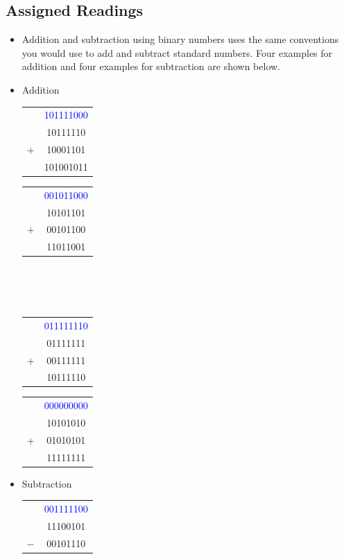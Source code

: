 \documentclass[10pt,a4paper]{article}
\begin{document}
\subsection{Assigned Readings}
\begin{itemize}
\item Addition and subtraction using binary numbers uses the same conventions you would use to add and subtract standard numbers. Four examples for addition and four examples for subtraction are shown below. 
\item Addition\\
\begin{tabular}{cc}
  & \textcolor{blue}{101111000}\\
  & 10111110\\
+ & 10001101\\
\hline
 & 101001011\\
\end{tabular}\hspace{.5cm}
\begin{tabular}{cc}
  & \textcolor{blue}{001011000}\\
  & 10101101\\
+ & 00101100\\
\hline
 & 11011001\\
\end{tabular}\\~\\~\\
\begin{tabular}{cc}
  & \textcolor{blue}{011111110}\\
  & 01111111\\
+ & 00111111\\
\hline
 & 10111110\\
\end{tabular}\hspace{.5cm}
\begin{tabular}{cc}
  & \textcolor{blue}{000000000}\\
  & 10101010\\
+ & 01010101\\
\hline
 & 11111111\\
\end{tabular}
\item Subtraction\\
\begin{tabular}{cc}
  & \textcolor{blue}{001111100}\\
  & 11100101\\
$-$ & 00101110\\

\end{tabular}
\end{itemize}
\end{document}
